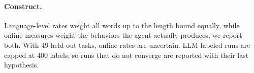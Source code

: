 \paragraph{Construct.}
Language-level rates weight all words up to the length bound equally, while online measures weight the behaviors the
agent actually produces; we report both. With 49 held-out tasks, online rates are uncertain. LLM-labeled runs are capped at
400 labels, so runs that do not converge are reported with their last hypothesis.
